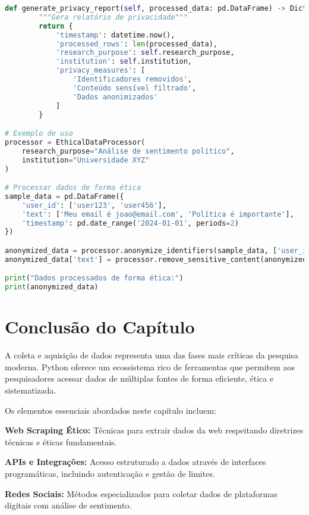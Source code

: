 \begin{pythonbox}
\begin{lstlisting}[language=Python]
    def generate_privacy_report(self, processed_data: pd.DataFrame) -> Dict:
        """Gera relatório de privacidade"""
        return {
            'timestamp': datetime.now(),
            'processed_rows': len(processed_data),
            'research_purpose': self.research_purpose,
            'institution': self.institution,
            'privacy_measures': [
                'Identificadores removidos',
                'Conteúdo sensível filtrado',
                'Dados anonimizados'
            ]
        }

# Exemplo de uso
processor = EthicalDataProcessor(
    research_purpose="Análise de sentimento político",
    institution="Universidade XYZ"
)

# Processar dados de forma ética
sample_data = pd.DataFrame({
    'user_id': ['user123', 'user456'],
    'text': ['Meu email é joao@email.com', 'Política é importante'],
    'timestamp': pd.date_range('2024-01-01', periods=2)
})

anonymized_data = processor.anonymize_identifiers(sample_data, ['user_id'])
anonymized_data['text'] = processor.remove_sensitive_content(anonymized_data['text'])

print("Dados processados de forma ética:")
print(anonymized_data)
\end{lstlisting}
\end{pythonbox}

\section{Conclusão do Capítulo}

A coleta e aquisição de dados representa uma das fases mais críticas da pesquisa moderna. Python oferece um ecossistema rico de ferramentas que permitem aos pesquisadores acessar dados de múltiplas fontes de forma eficiente, ética e sistematizada.

Os elementos essenciais abordados neste capítulo incluem:

\textbf{Web Scraping Ético:} Técnicas para extrair dados da web respeitando diretrizes técnicas e éticas fundamentais.

\textbf{APIs e Integrações:} Acesso estruturado a dados através de interfaces programáticas, incluindo autenticação e gestão de limites.

\textbf{Redes Sociais:} Métodos especializados para coletar dados de plataformas digitais com análise de sentimento.

